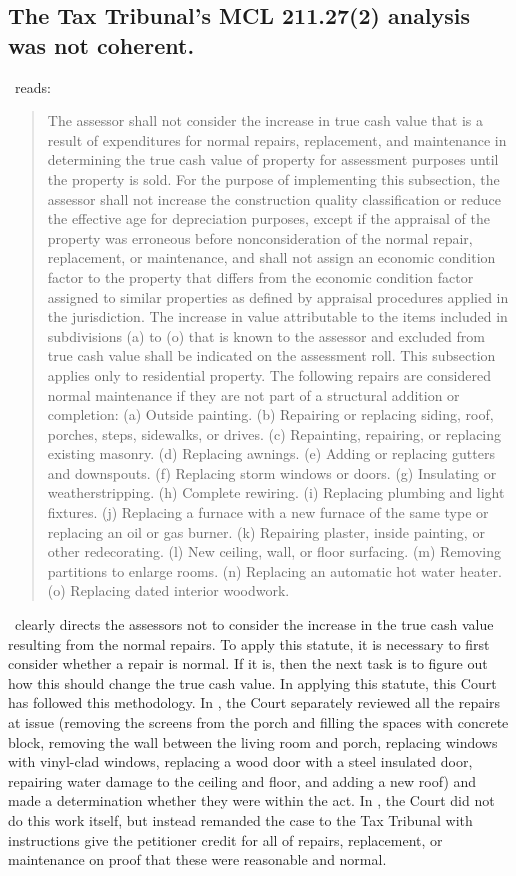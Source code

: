 \documentclass[12pt,\documentclassflag]{michiganCourtOfAppealsBrief}
\def\mathieuGast{\pincite[l]{MCL}{211.27(2)}}
\begin{document}
\subsection{The Tax Tribunal's MCL 211.27(2) analysis was not coherent.}

\matheiuGast\ reads:
\begin{quote}
  The assessor shall not consider the increase in true cash value that is a result of expenditures for normal repairs, replacement, and maintenance in determining the true cash value of property for assessment purposes until the property is sold. For the purpose of implementing this subsection, the assessor shall not increase the construction quality classification or reduce the effective age for depreciation purposes, except if the appraisal of the property was erroneous before nonconsideration of the normal repair, replacement, or maintenance, and shall not assign an economic condition factor to the property that differs from the economic condition factor assigned to similar properties as defined by appraisal procedures applied in the jurisdiction. The increase in value attributable to the items included in subdivisions (a) to (o) that is known to the assessor and excluded from true cash value shall be indicated on the assessment roll. This subsection applies only to residential property. The following repairs are considered normal maintenance if they are not part of a structural addition or completion:
(a) Outside painting. (b) Repairing or replacing siding, roof, porches, steps, sidewalks, or drives. (c) Repainting, repairing, or replacing existing masonry. (d) Replacing awnings. (e) Adding or replacing gutters and downspouts. (f) Replacing storm windows or doors. (g) Insulating or weatherstripping. (h) Complete rewiring. (i) Replacing plumbing and light fixtures. (j) Replacing a furnace with a new furnace of the same type or replacing an oil or gas burner. (k) Repairing plaster, inside painting, or other redecorating. (l) New ceiling, wall, or floor surfacing. (m) Removing partitions to enlarge rooms. (n) Replacing an automatic hot water heater. (o) Replacing dated interior woodwork.
\end{quote}

\mathieuGast\ clearly directs the assessors not to consider the increase in the true cash value resulting from the normal repairs. To apply this statute, it is necessary to first consider whether a repair is normal. If it is, then the next task is to figure out how this should change the true cash value. In applying this statute, this Court has followed this methodology. In \cite{Coyne}, the Court separately reviewed all the repairs at issue (removing the screens from the porch and filling the spaces with concrete block, removing the wall between the living room and porch, replacing windows with vinyl-clad windows, replacing a wood door with a steel insulated door, repairing water damage to the ceiling and floor, and adding a new roof) and made a determination whether they were within the act. In \cite{Fisher}, the Court did not do this work itself, but instead remanded the case to the Tax Tribunal with instructions give the petitioner credit for all of repairs, replacement, or maintenance on proof that these were reasonable and normal.
\end{document}
